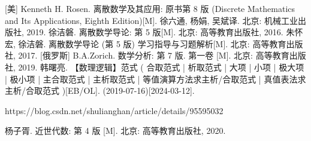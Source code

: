 \documentclass[10pt,UTF8]{book} %
\begin{document}










\begin{thebibliography}{1}
    [美] Kenneth H. Rosen. 离散数学及其应用: 原书第 8 版 (Discrete Mathematics 
    and Its Applications, Eighth Edition)[M]. 徐六通, 杨娟, 吴斌译.
    北京: 机械工业出版社, 2019.
    徐洁磐. 离散数学导论: 第 5 版[M]. 北京: 高等教育出版社, 2016.
    朱怀宏, 徐洁磐. 离散数学导论 (第 5 版) 学习指导与习题解析[M].
    北京: 高等教育出版社, 2017.
    [俄罗斯] B.A.Zorich. 数学分析: 第 7 版. 第一卷 [M].
    北京: 高等教育出版社, 2019.
    韩曙亮. 【数理逻辑】范式 ( 合取范式 | 析取范式 | 大项 | 小项 | 极大项 | 极小项 | 主合取范式 | 主析取范式 | 等值演算方法求主析/合取范式 | 真值表法求主析/合取范式 )[EB/OL]. (2019-07-16)[2024-03-12].
    
    https://blog.csdn.net/shulianghan/article/details/95595032

    杨子胥. 近世代数: 第 4 版 [M]. 北京: 高等教育出版社, 2020.
\end{thebibliography}


\end{document}
